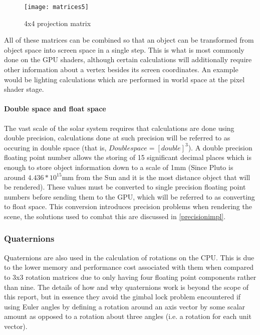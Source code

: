 \begin{figure}[!htbp]
  \begin{center}
    \leavevmode
    \ifpdf
      \texttt{[image: matrices5]}
    \fi
    \caption{4x4 projection matrix}
    \label{FigMatrices5}
  \end{center}
\end{figure}

\pagebreak
All of these matrices can be combined so that an object can be transformed from object space into screen space in a single step. This is what is most commonly done on the GPU shaders,
 although certain calculations will additionally require other information about a vertex besides its screen coordinates. An example would be lighting calculations which are performed in world space at the pixel shader stage.

\paragraph{Double space and float space}

The vast scale of the solar system requires that calculations are done using double precision, calculations done at such precision will be referred to as occuring in double space (that is, $Double space = [double]^3$).
A double precision floating point number allows the storing of 15 significant decimal places which is enough to store object information down to a scale of 1mm (Since Pluto is around $4.436*10^15$mm from the Sun
 and it is the most distance object that will be rendered). These values must be converted to single precision floating point numbers before sending them to the GPU, which will be referred to as converting to float space. 
 This conversion introduces precision problems when rendering the scene, the solutions used to combat this are discussed in \cref{precisionimpl}.

\subsubsection{Quaternions}

Quaternions are also used in the calculation of rotations on the CPU. 
This is due to the lower memory and performance cost associated with them when compared to 3x3 rotation matrices due to only having four floating point components rather than nine. 
The details of how and why quaternions work is beyond the scope of this report, but in essence they avoid the gimbal lock problem encountered if using Euler angles by defining a rotation around an axis vector by some scalar amount as opposed to a rotation about three angles (i.e. a rotation for each unit vector).

